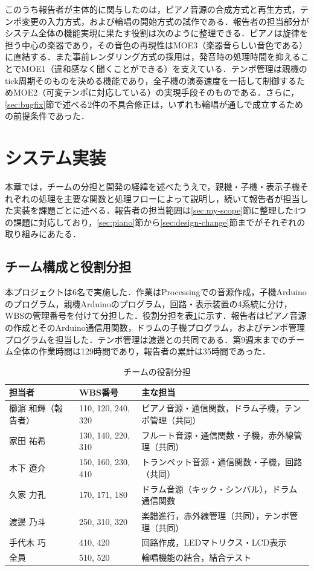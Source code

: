 \documentclass[uplatex,dvipdfmx]{jlreq}
\begin{document}
このうち報告者が主体的に関与したのは，ピアノ音源の合成方式と再生方式，テンポ変更の入力方式，および輪唱の開始方式の試作である．報告者の担当部分がシステム全体の機能実現に果たす役割は次のように整理できる．ピアノは旋律を担う中心の楽器であり，その音色の再現性はMOE3（楽器音らしい音色である）に直結する．また事前レンダリング方式の採用は，発音時の処理時間を抑えることでMOE1（違和感なく聞くことができる）を支えている．テンポ管理は親機のtick周期そのものを決める機能であり，全子機の演奏速度を一括して制御するためMOE2（可変テンポに対応している）の実現手段そのものである．さらに，\ref{sec:bugfix}節で述べる2件の不具合修正は，いずれも輪唱が通しで成立するための前提条件であった．

\section{システム実装}
\label{sec:impl}

本章では，チームの分担と開発の経緯を述べたうえで，親機・子機・表示子機それぞれの処理を主要な関数と処理フローによって説明し，続いて報告者が担当した実装を課題ごとに述べる．報告者の担当範囲は\ref{sec:my-scope}節に整理した4つの課題に対応しており，\ref{sec:piano}節から\ref{sec:design-change}節までがそれぞれの取り組みにあたる．

\subsection{チーム構成と役割分担}

本プロジェクトは6名で実施した．作業はProcessingでの音源作成，子機Arduinoのプログラム，親機Arduinoのプログラム，回路・表示装置の4系統に分け，WBSの管理番号を付けて分担した．役割分担を表\ref{tab:roles}に示す．報告者はピアノ音源の作成とそのArduino通信用関数，ドラムの子機プログラム，およびテンポ管理プログラムを担当した．テンポ管理は渡邊との共同である．第9週末までのチーム全体の作業時間は129時間であり，報告者の累計は35時間であった．

\begin{table}[tb]
\caption{チームの役割分担}
\label{tab:roles}
\begin{center}
\small
\begin{tabular}{lll}
\hline
担当者 & WBS番号 & 主な担当 \\
\hline
櫛濵 和輝（報告者） & 110, 120, 240, 320 & ピアノ音源・通信関数，ドラム子機，テンポ管理（共同） \\
家田 祐希 & 130, 140, 220, 310 & フルート音源・通信関数・子機，赤外線管理（共同） \\
木下 遼介 & 150, 160, 230, 410 & トランペット音源・通信関数・子機，回路（共同） \\
久家 力孔 & 170, 171, 180 & ドラム音源（キック・シンバル），ドラム通信関数 \\
渡邊 乃斗 & 250, 310, 320 & 楽譜進行，赤外線管理（共同），テンポ管理（共同） \\
手代木 巧 & 410, 420 & 回路作成，LEDマトリクス・LCD表示 \\
全員 & 510, 520 & 輪唱機能の結合，結合テスト \\
\hline
\end{tabular}
\end{center}
\end{table}
\end{document}
